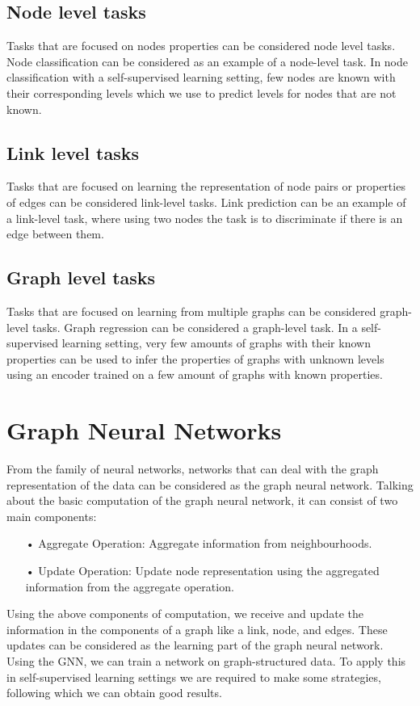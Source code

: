 \documentclass[a4paper,11pt]{report}
\begin{document}
\section{Node level tasks}
Tasks that are focused on nodes properties can be considered node level tasks. Node classification can be considered as an example of a node-level task. In node classification with a self-supervised learning setting, few nodes are known with their corresponding levels which we use to predict levels for nodes that are not known.
\section{Link level tasks}
Tasks that are focused on learning the representation of node pairs or properties of edges can be considered link-level tasks. Link prediction can be an example of a link-level task, where using two nodes the task is to discriminate if there is an edge between them.
\section{Graph level tasks}
Tasks that are focused on learning from multiple graphs can be considered graph-level tasks. Graph regression can be considered a graph-level task. In a self-supervised learning setting, very few amounts of graphs with their known properties can be used to infer the properties of graphs with unknown levels using an encoder trained on a few amount of graphs with known properties.

\chapter{Graph Neural Networks}

From the family of neural networks, networks that can deal with the graph representation of the data can be considered as the graph neural network. Talking about the basic computation of the graph neural network, it can consist of two main components:

\begin{itemize}
\item[•] Aggregate Operation: Aggregate information from neighbourhoods.

\item[•] Update Operation: Update node representation using the aggregated information from the aggregate operation.
\end{itemize}

Using the above components of computation, we receive and update the information in the components of a graph like a link, node, and edges. These updates can be considered as the learning part of the graph neural network. Using the GNN, we can train a network on graph-structured data. To apply this in self-supervised learning settings we are required to make some strategies, following which we can obtain good results. 
\end{document}
